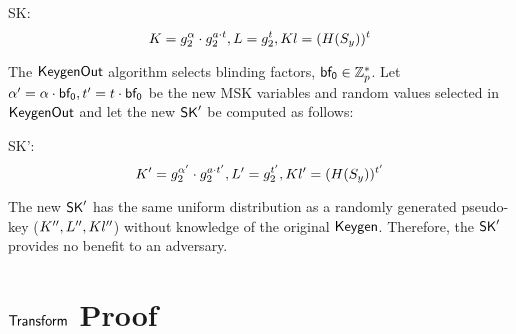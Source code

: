 \documentclass[11pt]{article}
\begin{document}
\begin{description}
\item {\sf SK}: \begin{equation}  K = g_2^{\alpha} \cdot g_2^{a \cdot t},L = g_2^{t},Kl = (H(S_y))^{t} \end{equation}
\end{description}

\noindent
The $\mathsf{KeygenOut}$ algorithm selects blinding factors, ${\sf bf_0} \in \mathbb{Z}_p^*$. Let $\alpha' = {\alpha \cdot {\sf bf_0}},t' = {t \cdot {\sf bf_0}}$ be the new MSK variables and random values selected in $\mathsf{KeygenOut}$ and let the new $\mathsf{SK}'$ be computed as follows:

\begin{description}
\item {\sf SK'}: \begin{equation}  K' = g_2^{\alpha'} \cdot g_2^{a \cdot t'},L' = g_2^{t'},Kl' = (H(S_y))^{t'} \end{equation}
\end{description}

\noindent
The new $\mathsf{SK}'$ has the same uniform distribution as a randomly generated pseudo-key ($K'',L'',Kl''$) without knowledge of the original $\mathsf{Keygen}$. Therefore, the $\mathsf{SK}'$ provides no benefit to an adversary.

\section{$\mathsf{Transform}$ Proof}
\end{document}
